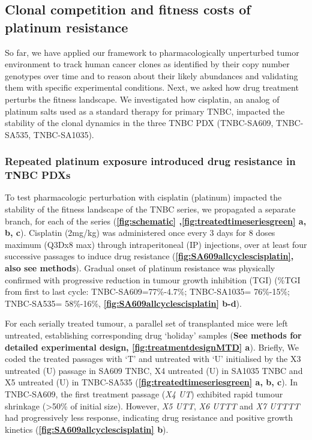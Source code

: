 \subsection{Clonal competition and fitness costs of platinum resistance}
So far, we have applied our framework to pharmacologically unperturbed tumor environment to track human cancer clones as identified by their copy number genotypes over time and to reason about their likely abundances and validating them with specific experimental conditions. Next, we asked how drug treatment perturbs the fitness landscape. We investigated how cisplatin, an analog of platinum salts used as a standard therapy for primary TNBC, impacted the stability of the clonal dynamics in the three TNBC PDX (TNBC-SA609, TNBC-SA535, TNBC-SA1035).


\subsubsection{Repeated platinum exposure introduced drug resistance in TNBC PDXs} 
 To test pharmacologic perturbation with cisplatin (platinum) impacted the stability of the fitness landscape of the TNBC series, we propagated a separate branch, for each of the series (\textbf{\autoref{fig:schematic} ,\autoref{fig:treatedtimeseriesgreen} a, b, c}). Cisplatin (2mg/kg) was administered once every 3 days for 8 doses maximum (Q3Dx8 max) through intraperitoneal (IP) injections, over at least four successive passages to induce drug resistance  (\textbf{\autoref{fig:SA609allcyclescisplatin}, also see methods}). Gradual onset of platinum resistance was physically confirmed with progressive reduction in tumour growth inhibition (TGI) \cite{hather2014growth} (\%TGI from first to last cycle: TNBC-SA609=77\%-4.7\%; TNBC-SA1035= 76\%-15\%; TNBC-SA535= 58\%-16\%, \textbf{\autoref{fig:SA609allcyclescisplatin} b-d}).
 
 For each serially treated tumour, a parallel set of transplanted mice were left untreated, establishing corresponding drug `holiday' samples (\textbf{See methods for detailed experimental design, \textbf{\autoref{fig:treatmentdesignMTD} a}}). Briefly, We coded the treated passages with `T' and untreated with `U' initialised by the X3 untreated (U) passage in SA609 TNBC, X4 untreated (U) in SA1035 TNBC and X5 untreated (U) in  TNBC-SA535 (\textbf{\autoref{fig:treatedtimeseriesgreen} a, b, c}). In TNBC-SA609, the first treatment passage (\textit{X4 UT}) exhibited rapid tumour shrinkage (>50\% of initial size). However, \textit{X5 UTT}, \textit{X6 UTTT} and \textit{X7 UTTTT} had progressively less response, indicating drug resistance and positive growth kinetics (\textbf{\autoref{fig:SA609allcyclescisplatin} b}).


